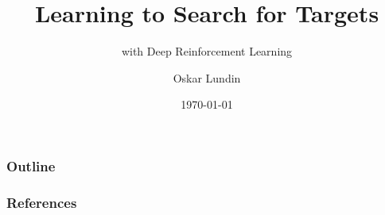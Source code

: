 \documentclass{beamer}
\title{Learning to Search for Targets}
\subtitle{with Deep Reinforcement Learning}
\author{Oskar Lundin}
\institute{Linköping University}
\date{\today}
\begin{document}
\begin{frame}
    \titlepage
\end{frame}

\begin{frame}
    \frametitle{Outline}
    \tableofcontents
\end{frame}






\begin{frame}[t,allowframebreaks]
    \frametitle{References}
    
    
\end{frame}
\end{document}

